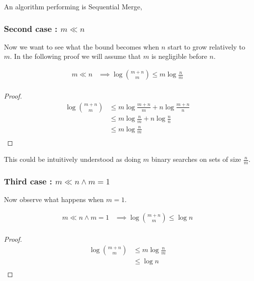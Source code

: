 An algorithm performing  is Sequential Merge,


\subsubsection{Second case\texorpdfstring{ : $m \ll n$}{}}


Now we want to see what the bound becomes when $n$ start to grow relatively to
$m$. In the following proof we will assume that $m$ is negligible before $n$.


\begin{lemma}
\begin{align*}
m \ll n &\implies \log\binom{m+n}{m} \leq m \log\frac{n}{m}\\
\end{align*}
\end{lemma}

\begin{proof}
\begin{align*}
\log\binom{m+n}{m} &\leq m \log\frac{m+n}{m} + n \log\frac{m+n}{n}\\
&\leq m \log\frac{n}{m} + n \log\frac{n}{n}\\
&\leq m \log\frac{n}{m}\\
\end{align*}
\end{proof}


This could be intuitively understood as doing $m$ binary searches on sets of
size $\frac{n}{m}$.



\subsubsection{Third case\texorpdfstring{ : $m \ll n \land m = 1$}{}}

Now observe what happens when $m = 1$.

\begin{lemma}
\begin{align*}
m \ll n \land m = 1 &\implies \log\binom{m+n}{m} \leq \log n\\
\end{align*}
\end{lemma}

\begin{proof}
\begin{align*}
\log\binom{m+n}{m} &\leq m \log\frac{n}{m}\\
&\leq \log n\\
\end{align*}
\end{proof}

